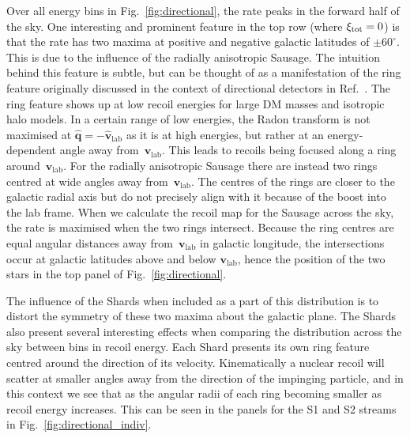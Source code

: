 \documentclass[prd,10pt,twocolumn,showpacs,nofootinbib,aps,superscriptaddress,preprintnumbers]{revtex4-1}
\newcommand{\vlab}{\mathbf{v}_\mathrm{lab}}
\begin{document}
  Over all energy bins in Fig.~\ref{fig:directional}, the rate peaks in
  the forward half of the sky. One interesting and prominent feature in
  the top row (where $\xi_{\rm tot}=0$) is that the rate has two maxima at
  positive and negative galactic latitudes of $\pm 60^\circ$. This is due to the influence of the radially anisotropic Sausage. 
  The intuition behind this feature is subtle, but can be thought of as a 
  manifestation of the ring feature originally discussed in the context of 
  directional detectors in Ref.~\cite{Bozorgnia:2011vc}. The ring feature 
  shows up at low recoil energies for large DM masses and isotropic 
  halo models. In a certain range of low energies, the Radon transform 
  is not maximised at $\hat{\textbf{q}} = -\hat{\textbf{v}}_\textrm{lab}$ 
  as it is at high energies, but rather at an energy-dependent angle away 
  from~$\vlab$. This leads to recoils being focused along a ring around~$\vlab$. 
  For the radially anisotropic Sausage there are instead two rings centred 
  at wide angles away from~$\vlab$. The centres of the rings are closer 
  to the galactic radial axis but do not precisely align with it because of 
  the boost into the lab frame. When we calculate the recoil map for 
  the Sausage across the sky, the rate is maximised when the two rings 
  intersect. Because the ring centres are equal angular distances away 
  from~$\vlab$ in galactic longitude, the intersections occur at galactic 
  latitudes above and below $\vlab$, hence the position of the two stars 
  in the top panel of Fig.~\ref{fig:directional}.
  
  The influence of the Shards when included as a part of this distribution 
  is to distort the symmetry of these two maxima about the galactic plane. 
  The Shards also present several interesting effects when comparing the 
  distribution across the sky between bins in recoil energy. Each Shard presents 
  its own ring feature centred around the direction of its velocity. Kinematically 
  a nuclear recoil will scatter at smaller angles away from the direction 
  of the impinging particle, and in this context we see that as the angular 
  radii of each ring becoming smaller as recoil energy increases. This can 
  be seen in the panels for the S1 and S2 streams in Fig.~\ref{fig:directional_indiv}.
  
\end{document}
